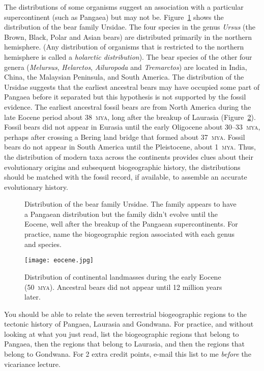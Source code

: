 \documentclass[11pt, hidelinks]{article}
\newcommand{\MYA}{\textsc{mya}}
\begin{document}
The distributions of some organisms suggest an association with a particular supercontinent (such as Pangaea) but may not be. Figure~\ref{Bear Distribution} shows the distribution of the bear family Ursidae.  The four species in the genus \emph{Ursus} (the Brown, Black, Polar and Asian bears) are distributed primarily in the northern hemisphere. (Any distribution of organisms that is restricted to the northern hemisphere is called a \emph{holarctic distribution}).  The bear species of the other four genera (\emph{Melursus}, \emph{Helarctos}, \emph{Ailuropoda} and \emph{Tremarctos}) are located in India, China, the Malaysian Peninsula, and South America. The distribution of the Ursidae suggests that the earliest ancestral bears may have occupied some part of Pangaea before it separated but this hypothesis is not supported by the fossil evidence. The earliest ancestral fossil bears are from North America during the late Eocene period about 38~\MYA, long after the breakup of Laurasia (Figure~\ref{Eocene Map}). Fossil bears did not appear in Eurasia until the early Oligocene about 30--33~\MYA, perhaps after crossing a Bering land bridge that formed about 37~\MYA.  Fossil bears do not appear in South America until the Pleistocene, about 1~\MYA.  Thus, the distribution of modern taxa across the continents provides clues about their evolutionary origins and subsequent biogeographic history, the distributions should be matched with the fossil record, if available, to assemble an accurate evolutionary history.  

\begin{figure}[tb]
	\centering
		\caption{Distribution of the bear family Ursidae. The family appears to have a Pangaean distribution but the family didn't evolve until the Eocene, well after the breakup of the Pangaean supercontinents. For practice, name the biogeographic region associated with each genus and species.\label{Bear Distribution}}
		
\end{figure}

\begin{figure}[tb]
	\centering
		\texttt{[image: eocene.jpg]}  
		\caption{Distribution of continental landmasses during the early Eocene (50~\MYA). Ancestral bears did not appear until 12 million years later.\label{Eocene Map}}
		
\end{figure}


You should be able to relate the seven terrestrial biogeographic regions to the tectonic history of Pangaea, Laurasia and Gondwana. For practice, and without looking at what you just read, list the biogeographic regions that belong to Pangaea, then the regions that belong to Laurasia, and then the regions that belong to Gondwana. For 2 extra credit points, e-mail this list to me \emph{before} the vicariance lecture.
\end{document}
